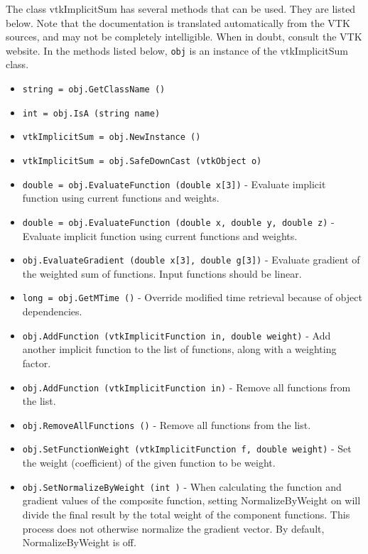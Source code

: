 The class vtkImplicitSum has several methods that can be used.
  They are listed below.
Note that the documentation is translated automatically from the VTK sources,
and may not be completely intelligible.  When in doubt, consult the VTK website.
In the methods listed below, \verb|obj| is an instance of the vtkImplicitSum class.
\begin{itemize}
\item  \verb|string = obj.GetClassName ()|

\item  \verb|int = obj.IsA (string name)|

\item  \verb|vtkImplicitSum = obj.NewInstance ()|

\item  \verb|vtkImplicitSum = obj.SafeDownCast (vtkObject o)|

\item  \verb|double = obj.EvaluateFunction (double x[3])| -  Evaluate implicit function using current functions and weights.

\item  \verb|double = obj.EvaluateFunction (double x, double y, double z)| -  Evaluate implicit function using current functions and weights.

\item  \verb|obj.EvaluateGradient (double x[3], double g[3])| -  Evaluate gradient of the weighted sum of functions.  Input functions
 should be linear.

\item  \verb|long = obj.GetMTime ()| -  Override modified time retrieval because of object dependencies.

\item  \verb|obj.AddFunction (vtkImplicitFunction in, double weight)| -  Add another implicit function to the list of functions, along with a
 weighting factor.

\item  \verb|obj.AddFunction (vtkImplicitFunction in)| -  Remove all functions from the list.

\item  \verb|obj.RemoveAllFunctions ()| -  Remove all functions from the list.

\item  \verb|obj.SetFunctionWeight (vtkImplicitFunction f, double weight)| -  Set the weight (coefficient) of the given function to be weight.

\item  \verb|obj.SetNormalizeByWeight (int )| -  When calculating the function and gradient values of the
 composite function, setting NormalizeByWeight on will divide the
 final result by the total weight of the component functions.
 This process does not otherwise normalize the gradient vector.
 By default, NormalizeByWeight is off.


\end{itemize}
